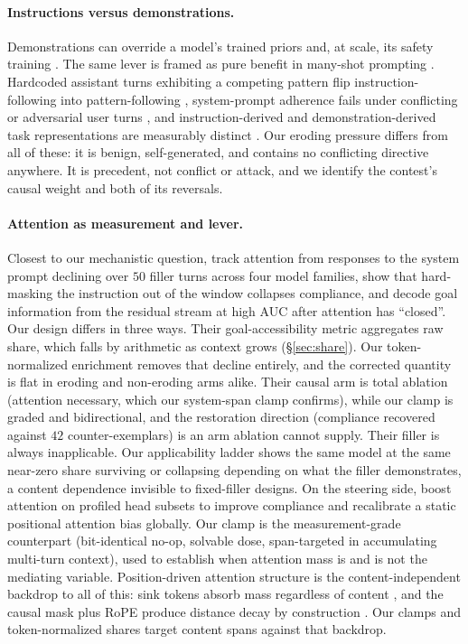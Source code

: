 \documentclass{article}
\begin{document}
\paragraph{Instructions versus demonstrations.}
Demonstrations can override a model's trained priors \citep{wei2023icldifferently} and, at
scale, its safety training \citep{anil2024manyshot}. The same lever is framed as pure benefit in
many-shot prompting \citep{agarwal2024manyshot}. Hardcoded assistant turns exhibiting a
competing pattern flip instruction-following into pattern-following
\citep{camassa2026instructioninduction}, system-prompt adherence fails under conflicting or
adversarial user turns \citep{mu2025systemprompt}, and instruction-derived and
demonstration-derived task representations are measurably distinct
\citep{davidson2025taskrepresentation}. Our eroding pressure differs from all of these: it is
benign, self-generated, and contains no conflicting directive anywhere. It is precedent, not
conflict or attack, and we identify the contest's causal weight and both of its reversals.

\paragraph{Attention as measurement and lever.}
Closest to our mechanistic question, \citet{dongre2026attentioncloses} track attention from
responses to the system prompt declining over $50$ filler turns across four model families, show
that hard-masking the instruction out of the window collapses compliance, and decode goal
information from the residual stream at high AUC after attention has ``closed''. Our design differs in three ways. Their goal-accessibility metric aggregates raw share, which falls by
arithmetic as context grows (\S\ref{sec:share}). Our token-normalized enrichment removes that
decline entirely, and the corrected quantity is flat in eroding and non-eroding arms alike.
Their causal arm is total ablation (attention necessary, which our system-span clamp
confirms), while our clamp is graded and bidirectional, and the restoration direction
(compliance recovered against $42$ counter-exemplars) is an arm ablation cannot supply. Their filler is always inapplicable. Our applicability ladder shows the same model at the same
near-zero share surviving or collapsing depending on what the filler demonstrates, a content
dependence invisible to fixed-filler designs. On the steering side, \citet{zhang2023pasta} boost
attention on profiled head subsets to improve compliance and \citet{hsieh2024foundinmiddle}
recalibrate a static positional attention bias globally. Our clamp is the measurement-grade
counterpart (bit-identical no-op, solvable dose, span-targeted in accumulating multi-turn
context), used to establish when attention mass is and is not the mediating variable.
Position-driven attention structure is the content-independent backdrop to all of this: sink
tokens absorb mass regardless of content \citep{xiao2023streamingllm,gu2024attentionsink}, and
the causal mask plus RoPE produce distance decay by construction \citep{wu2025positionbias}.
Our clamps and token-normalized shares target content spans against that backdrop.
\end{document}
